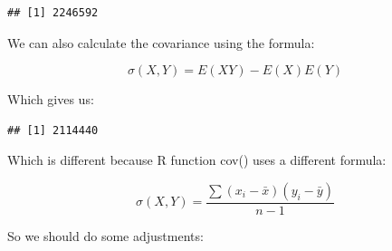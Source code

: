 \documentclass[
]{article}
\newenvironment{Shaded}{\begin{snugshade}}{\end{snugshade}}
\newcommand{\DecValTok}[1]{\textcolor[rgb]{0.00,0.00,0.81}{#1}}
\newcommand{\FunctionTok}[1]{\textcolor[rgb]{0.00,0.00,0.00}{#1}}
\newcommand{\NormalTok}[1]{#1}
\newcommand{\OtherTok}[1]{\textcolor[rgb]{0.56,0.35,0.01}{#1}}
\newcommand{\SpecialCharTok}[1]{\textcolor[rgb]{0.00,0.00,0.00}{#1}}
\begin{document}
\begin{Shaded}
\end{Shaded}

\begin{verbatim}
## [1] 2246592
\end{verbatim}

We can also calculate the covariance using the formula:

\[
\sigma(X,Y) = E(XY) - E(X)E(Y)
\]

Which gives us:

\begin{Shaded}
\end{Shaded}

\begin{verbatim}
## [1] 2114440
\end{verbatim}

Which is different because R function cov() uses a different formula:

\[
\sigma(X,Y) = \frac{\sum(x_i - \bar x)(y_i - \bar y)}{n-1}
\]

So we should do some adjustments:

\begin{Shaded}
\end{Shaded}
\end{document}
